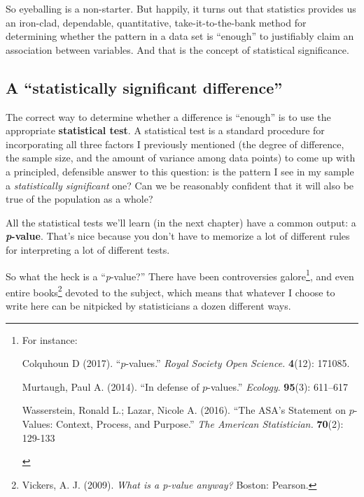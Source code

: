 So eyeballing is a non-starter. But happily, it turns out that statistics
provides us an iron-clad, dependable, quantitative, take-it-to-the-bank method
for determining whether the pattern in a data set is ``enough'' to justifiably
claim an association between variables. And that is the concept of statistical
significance.

\subsection{A ``statistically significant difference''}

The correct way to determine whether a difference is ``enough'' is to use the
appropriate \textbf{statistical test}. A statistical test is a standard
procedure for incorporating all three factors I previously mentioned (the
degree of difference, the sample size, and the amount of variance among data
points) to come up with a principled, defensible answer to this question: is
the pattern I see in my sample a \textit{statistically significant} one? Can we
be reasonably confident that it will also be true of the population as a whole?


All the statistical tests we'll learn (in the next chapter) have a common
output: a \textbf{\textit{p}-value}. That's nice because you don't have to
memorize a lot of different rules for interpreting a lot of different tests.

So what the heck is a ``\textit{p}-value?'' There have been controversies
galore\footnote{For instance:\\
\vspace{-.15in}
\begin{compactitem}
\item Colquhoun D (2017). ``$p$-values.'' \textit{Royal Society Open Science.}
\textbf{4}(12): 171085.
\item Murtaugh, Paul A. (2014). ``In defense of $p$-values.'' \textit{Ecology}.
\textbf{95}(3): 611--617
\item Wasserstein, Ronald L.; Lazar, Nicole A. (2016). ``The ASA's Statement on
$p$-Values: Context, Process, and Purpose.'' \textit{The American Statistician.}
\textbf{70}(2): 129-133
\end{compactitem}
\vspace{-.15in}
}, and even entire
books\footnote{Vickers, A. J. (2009). \textit{What is a p-value anyway?}
Boston: Pearson.} devoted to the subject, which means that whatever I choose to
write here can be nitpicked by statisticians a dozen different ways.

